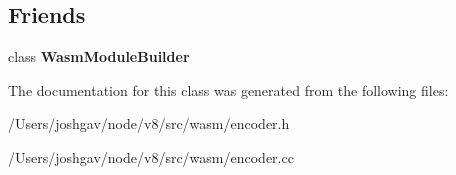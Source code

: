 \subsection*{Friends}
\begin{DoxyCompactItemize}
\item 
class {\bfseries Wasm\+Module\+Builder}\hypertarget{classv8_1_1internal_1_1wasm_1_1_wasm_function_builder_ace63ff4bed9fda245c733e10c4a9714b}{}\label{classv8_1_1internal_1_1wasm_1_1_wasm_function_builder_ace63ff4bed9fda245c733e10c4a9714b}

\end{DoxyCompactItemize}


The documentation for this class was generated from the following files\+:\begin{DoxyCompactItemize}
\item 
/\+Users/joshgav/node/v8/src/wasm/encoder.\+h\item 
/\+Users/joshgav/node/v8/src/wasm/encoder.\+cc\end{DoxyCompactItemize}
